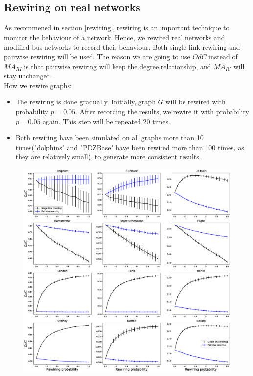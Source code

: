 \documentclass[12pt]{article}
\begin{document}
{\subsection{Rewiring on real networks}
As recommened in section \ref{rewiring}, rewiring is an important technique to monitor the behaviour of a network. Hence, we rewired real networks and modified bus networks to record their behaviour. Both single link rewiring and pairwise rewiring will be used. The reason we are going to use $OdC$ instead of $MA_{RI}$ is that pairwise rewiring will keep the degree relationship, and $MA_{RI}$ will stay unchanged.\\
How we rewire graphs:
\begin{itemize}
    \item The rewiring is done gradually. Initially, graph $G$ will be rewired with probability $p=0.05$. After recording the results, we rewire it with probability $p=0.05$ again. This step will be repeated 20 times.
    \item Both rewiring have been simulated on all graphs more than 10 times("dolphins" and "PDZBase" have been rewired more than 100 times, as they are relatively small), to generate more consistent results.
\end{itemize}
\begin{figure}[ht]
    \centering
    \includegraphics[width=\textwidth]{rewiring.eps}

\end{figure}}
\end{document}
